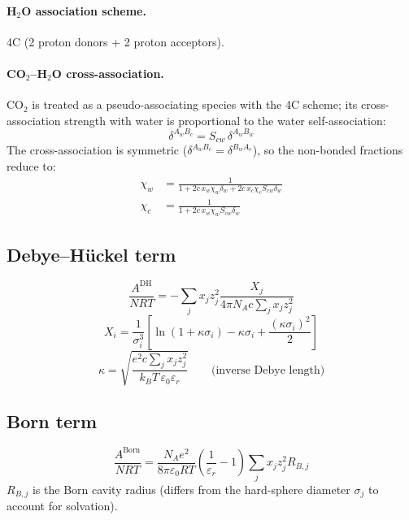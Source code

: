 \documentclass[11pt]{article}
\begin{document}
\paragraph{H$_2$O association scheme.} 4C (2 proton donors + 2 proton acceptors).

\paragraph{CO$_2$--H$_2$O cross-association.}
CO$_2$ is treated as a pseudo-associating species with the 4C scheme; its cross-association
strength with water is proportional to the water self-association:
\begin{equation}
  \delta^{A_wB_c} = S_{cw}\,\delta^{A_wB_w}
\end{equation}
The cross-association is symmetric ($\delta^{A_wB_c} = \delta^{B_wA_c}$), so the
non-bonded fractions reduce to:
\begin{align}
  \chi_w &= \frac{1}{1 + 2c\,x_w\chi_w\delta_w + 2c\,x_c\chi_c S_{cw}\delta_w}
  \label{eq:chi_w}\\
  \chi_c &= \frac{1}{1 + 2c\,x_w\chi_w S_{cw}\delta_w}
  \label{eq:chi_c}
\end{align}

\subsection{Debye--H\"uckel term}
\begin{equation}
  \frac{A^{\text{DH}}}{NRT}
    = -\sum_j x_j z_j^2 \frac{X_j}{4\pi N_A c\sum_j x_j z_j^2}
\end{equation}
\begin{equation}
  X_i = \frac{1}{\sigma_i^3}
    \left[\ln(1+\kappa\sigma_i) - \kappa\sigma_i + \frac{(\kappa\sigma_i)^2}{2}\right]
\end{equation}
\begin{equation}
  \kappa = \sqrt{\frac{e^2 c \sum_j x_j z_j^2}{k_B T\,\varepsilon_0\varepsilon_r}}
  \qquad \text{(inverse Debye length)}
\end{equation}

\subsection{Born term}
\begin{equation}
  \frac{A^{\text{Born}}}{NRT}
    = \frac{N_A e^2}{8\pi\varepsilon_0 RT}
      \left(\frac{1}{\varepsilon_r} - 1\right)
      \sum_j x_j z_j^2 R_{B,j}
\end{equation}
$R_{B,j}$ is the Born cavity radius (differs from the hard-sphere diameter $\sigma_j$
to account for solvation).
\end{document}
